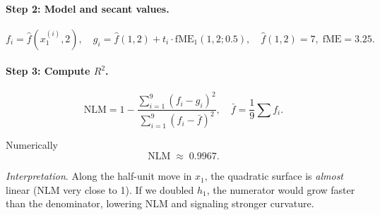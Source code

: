 {\begin{enumerate}[a)]
\paragraph{Step 2: Model and secant values.}
\[
  f_i = \hat f(x_1^{(i)},2), 
  \quad
  g_i = \hat f(1,2) + t_i\cdot \text{fME}_1(1,2;0.5),
  \quad
  \hat f(1,2)=7,\;
  \text{fME}=3.25.
\]

\paragraph{Step 3: Compute \(R^2\).}
\[
  \text{NLM}=1-\frac{\sum_{i=1}^{9}(f_i-g_i)^2}%
                     {\sum_{i=1}^{9}(f_i-\bar f)^2},
  \quad
  \bar f=\frac1{9}\sum f_i.
\]

Numerically  
\[
  \boxed{\text{NLM}\;\approx\;0.9967}.
\]

\emph{Interpretation}.  
Along the half-unit move in \(x_1\), the quadratic surface is
\emph{almost} linear (NLM very close to 1).  
If we doubled \(h_1\), the numerator would grow faster than the denominator,
lowering NLM and signaling stronger curvature.

\end{enumerate}

}

